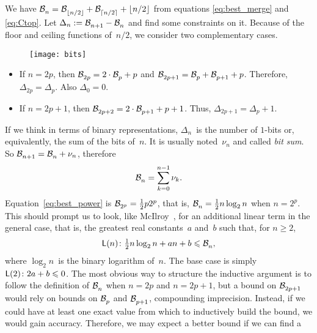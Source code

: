 We have \(\mathcal{B}_{n}^{} = \mathcal{B}_{\lfloor{n/2}\rfloor}^{} + \mathcal{B}_{\lceil{n/2}\rceil}^{} +
\lfloor{n/2}\rfloor\) from equations \eqref{eq:best_merge} and
\eqref{eq:Ctop}. Let \(\Delta_n := \mathcal{B}_{n+1}^{} - \mathcal{B}_{n}^{}\) and find some
constraints on it. Because of the floor and ceiling functions
of~\(n/2\), we consider two complementary cases.
\begin{wrapfigure}[22]{r}[0pt]{0pt}
\centering
\texttt{[image: bits]}
\caption{\label{fig:bits}}
\end{wrapfigure}
\begin{itemize}

  \item If \(n = 2p\), then \(\mathcal{B}_{2p}^{} = 2 \cdot \mathcal{B}_{p}^{} + p\)
    and \(\mathcal{B}_{2p+1}^{} = \mathcal{B}_{p}^{} + \mathcal{B}_{p+1}^{} +
    p\). Therefore, \(\Delta_{2p} = \Delta_{p}\). Also \(\Delta_0 =
    0\).

  \item If \(n = 2p+1\), then \(\mathcal{B}_{2p+2}^{} = 2 \cdot \mathcal{B}_{p+1}^{}
    + p + 1\). Thus, \(\Delta_{2p+1} = \Delta_{p} + 1\).

\end{itemize}
If we think in terms of binary representations, \(\Delta_n\)~is the
number of \(1\)-bits or, equivalently, the sum of the bits
of~\(n\). It is usually noted~\(\nu_n\) and called \emph{bit sum}. So
\(\mathcal{B}_{n+1}^{} = \mathcal{B}_{n}^{} + \nu_n\), therefore
\begin{equation}
\mathcal{B}_{n}^{} = \sum_{k=0}^{n-1}{\nu_k}.\label{eq:OB_tms}
\end{equation}
Equation~\eqref{eq:best_power} is \(\mathcal{B}_{2^p}^{} = \frac{1}{2}p2^p\),
that is, \(\mathcal{B}_{n}^{} = \frac{1}{2}n\log_2 n\) when \(n=2^p\). This should
prompt us to look, like McIlroy~\cite{McIlroy:1974}, for an additional
linear term in the general case, that is, the greatest real
constants~\(a\) and~\(b\) such that, for \(n \geqslant 2\),
\begin{equation}
\textsf{L}({n}) \colon \tfrac{1}{2}n\log_2 n + an + b \leqslant \mathcal{B}_{n}^{},
\label{ineq:McIlroy}
\end{equation}
where \(\log_2 n\)~is the binary logarithm of~\(n\). The base case is
simply \(\textsf{L}({2}) \colon 2a + b \leqslant 0\). The most obvious way
to structure the inductive argument is to follow the definition of
\(\mathcal{B}_{n}^{}\) when \(n=2p\) and \(n=2p+1\), but a bound on
\(\mathcal{B}_{2p+1}^{}\) would rely on bounds on \(\mathcal{B}_{p}^{}\) and \(\mathcal{B}_{p+1}^{}\),
compounding imprecision. Instead, if we could have at least one exact
value from which to inductively build the bound, we would gain
accuracy. Therefore, we may expect a better bound if we can find a
